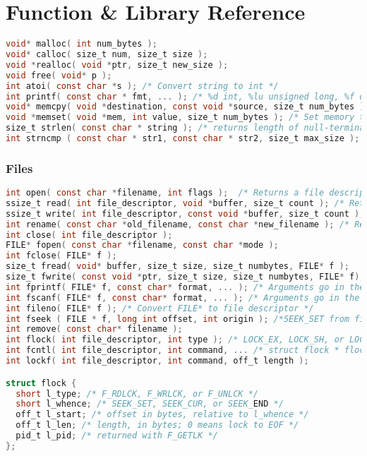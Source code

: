\documentclass[legalpaper,10pt]{article}
\begin{document}
\section*{Function \& Library Reference}

\lstset{numbers=none}

\begin{lstlisting}[language=C]
void* malloc( int num_bytes );
void* calloc( size_t num, size_t size );
void *realloc( void *ptr, size_t new_size );
void free( void* p );
int atoi( const char *s ); /* Convert string to int */
int printf( const char * fmt, ... ); /* %d int, %lu unsigned long, %f double,  %s string, \n newline, ...=args */
void* memcpy( void *destination, const void *source, size_t num_bytes ); /* Returns destination */
void *memset( void *mem, int value, size_t num_bytes ); /* Set memory to 0 */
size_t strlen( const char * string ); /* returns length of null-terminated string, not counting the terminator */
int strncmp ( const char * str1, const char * str2, size_t max_size ); /* return 0 if strings equal */
\end{lstlisting}

\subsubsection*{Files}

\begin{lstlisting}[language=C]
int open( const char *filename, int flags );  /* Returns a file descriptor if successful, -1 on error */
ssize_t read( int file_descriptor, void *buffer, size_t count ); /* Returns number of bytes read */
ssize_t write( int file_descriptor, const void *buffer, size_t count ); /* Returns number of bytes written */
int rename( const char *old_filename, const char *new_filename ); /* Returns 0 on success */
int close( int file_descriptor ); 
FILE* fopen( const char *filename, const char *mode );
int fclose( FILE* f );
size_t fread( void* buffer, size_t size, size_t numbytes, FILE* f );
size_t fwrite( const void *ptr, size_t size, size_t numbytes, FILE* f);
int fprintf( FILE* f, const char* format, ... ); /* Arguments go in the ...  */
int fscanf( FILE* f, const char* format, ... ); /* Arguments go in the ...  */
int fileno( FILE* f ); /* Convert FILE* to file descriptor */
int fseek ( FILE * f, long int offset, int origin ); /*SEEK_SET from file start. SEEK_CUR from current loc.*/
int remove( const char* filename );
int flock( int file_descriptor, int type ); /* LOCK_EX, LOCK_SH, or LOCK_UN for type */
int fcntl( int file_descriptor, int command, ... /* struct flock * flockptr */ );
int lockf( int file_descriptor, int command, off_t length );

struct flock {
  short l_type; /* F_RDLCK, F_WRLCK, or F_UNLCK */
  short l_whence; /* SEEK_SET, SEEK_CUR, or SEEK_END */
  off_t l_start; /* offset in bytes, relative to l_whence */ 
  off_t l_len; /* length, in bytes; 0 means lock to EOF */ 
  pid_t l_pid; /* returned with F_GETLK */
};

\end{lstlisting}
\end{document}
